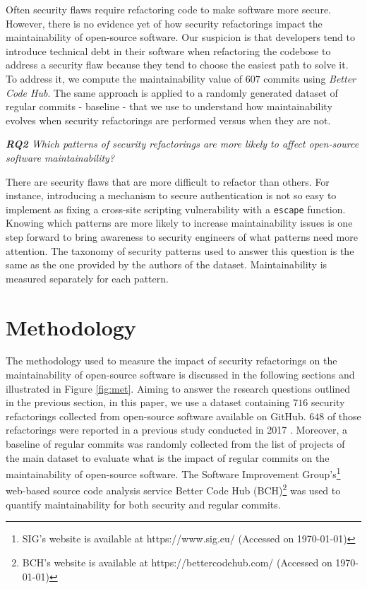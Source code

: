 \documentclass[10pt,conference]{IEEEtran}
\begin{document}
Often security flaws require refactoring code to make software more secure.
However, there is no evidence yet of how security refactorings impact the
maintainability of open-source software. Our suspicion is that developers tend
to introduce technical debt in their software when refactoring the codebose to
address a security flaw because they tend to choose the easiest path to solve
it. To address it, we compute the maintainability value of $607$ commits using
\emph{Better Code Hub}. The same approach is applied to a randomly generated
dataset of regular commits - baseline - that we use to understand how
maintainability evolves when security refactorings are performed versus when
they are not.

\begin{framed}
\textit{\textbf{RQ2} Which patterns of security refactorings are more likely to
affect open-source software maintainability?}
\end{framed}

There are security flaws that are more difficult to refactor than others. For
instance, introducing a mechanism to secure authentication is not so easy to
implement as fixing a cross-site scripting vulnerability with a \texttt{escape}
function. Knowing which patterns are more likely to increase maintainability
issues is one step forward to bring awareness to security engineers of what
patterns need more attention. The taxonomy of security patterns used to answer
this question is the same as the one provided by the authors of the dataset.
Maintainability is measured separately for each pattern.
%
\section{Methodology}\label{sec:methodology}
%
The methodology used to measure the impact of security refactorings on the
maintainability of open-source software is discussed in the following sections
and illustrated in Figure \ref{fig:met}. Aiming to answer the research questions
outlined in the previous section, in this paper, we use a dataset containing
$716$ security refactorings collected from open-source software available on
GitHub. $648$ of those refactorings were reported in a previous study conducted
in 2017 \cite{Reis:2017:IJSSE}. Moreover, a baseline of regular commits was
randomly collected from the list of projects of the main dataset to evaluate
what is the impact of regular commits on the maintainability of open-source
software. The Software Improvement Group's\footnote{SIG's website is available
at https://www.sig.eu/ (Accessed on \today{})} web-based source code
analysis service Better Code Hub (BCH)\footnote{BCH's website is available at
https://bettercodehub.com/ (Accessed on \today{})} was used to quantify
maintainability for both security and regular commits.
\end{document}
